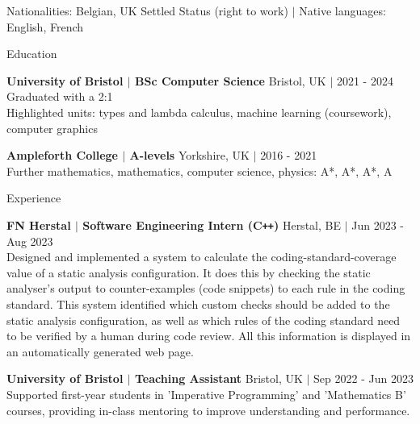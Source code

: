 \documentclass{resume} %
\begin{document}
\vspace{-10pt}
\begin{center}
    Nationalities: Belgian, UK Settled Status (right to work) ${\vert}$ Native languages: English, French
\end{center}

\begin{rSection}{Education}

{\bf University of Bristol $\boldsymbol{\vert}$ BSc Computer Science} \hfill Bristol, UK $\boldsymbol{\vert}$ 2021 - 2024 \\
Graduated with a 2:1 \\
Highlighted units: types and lambda calculus, machine learning (coursework), computer graphics

{\bf Ampleforth College $\boldsymbol{\vert}$ A-levels} \hfill Yorkshire, UK $\boldsymbol{\vert}$ 2016 - 2021 \\
Further mathematics, mathematics, computer science, physics: A*, A*, A*, A

\end{rSection}


\begin{rSection}{Experience}

\textbf{FN Herstal $\boldsymbol{\vert}$ Software Engineering Intern (C\texttt{++})} \hfill Herstal, BE $\boldsymbol{\vert}$ Jun 2023 - Aug 2023 \\
Designed and implemented a system to calculate the coding-standard-coverage value of a static analysis configuration. It does this by checking the static analyser's output to counter-examples (code snippets) to each rule in the coding standard. This system identified which custom checks should be added to the static analysis configuration, as well as which rules of the coding standard need to be verified by a human during code review. All this information is displayed in an automatically generated web page.

\textbf{University of Bristol $\boldsymbol{\vert}$ Teaching Assistant} \hfill Bristol, UK $\boldsymbol{\vert}$ Sep 2022 - Jun 2023 \\
Supported first-year students in 'Imperative Programming' and 'Mathematics B' courses, providing in-class mentoring to improve understanding and performance.

\end{rSection}
\end{document}
